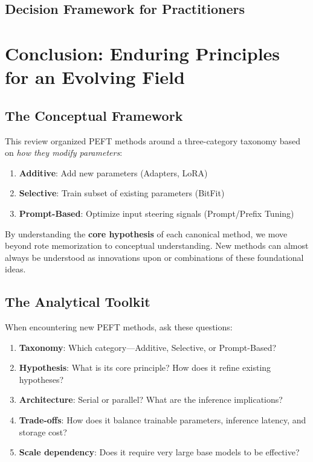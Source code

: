 \documentclass{article}
\begin{document}
\subsection{Decision Framework for Practitioners}

\begin{center}
\end{center}

\section{Conclusion: Enduring Principles for an Evolving Field}

\subsection{The Conceptual Framework}

This review organized PEFT methods around a three-category taxonomy based on \textit{how they modify parameters}:

\begin{enumerate}
\item \textbf{Additive}: Add new parameters (Adapters, LoRA)
\item \textbf{Selective}: Train subset of existing parameters (BitFit)
\item \textbf{Prompt-Based}: Optimize input steering signals (Prompt/Prefix Tuning)
\end{enumerate}

By understanding the \textbf{core hypothesis} of each canonical method, we move beyond rote memorization to conceptual understanding. New methods can almost always be understood as innovations upon or combinations of these foundational ideas.

\subsection{The Analytical Toolkit}

When encountering new PEFT methods, ask these questions:

\begin{enumerate}
\item \textbf{Taxonomy}: Which category---Additive, Selective, or Prompt-Based?
\item \textbf{Hypothesis}: What is its core principle? How does it refine existing hypotheses?
\item \textbf{Architecture}: Serial or parallel? What are the inference implications?
\item \textbf{Trade-offs}: How does it balance trainable parameters, inference latency, and storage cost?
\item \textbf{Scale dependency}: Does it require very large base models to be effective?
\end{enumerate}
\end{document}
